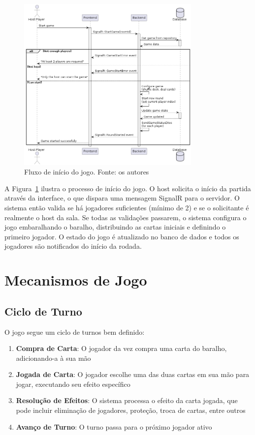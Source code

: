 \begin{figure}[h]
    \centering
    \includegraphics[width=0.8\textwidth]{diagrams/StartGame.png}
    \caption{Fluxo de início do jogo. Fonte: os autores}
    \label{fig:start-game-flow}
\end{figure}

A Figura~\ref{fig:start-game-flow} ilustra o processo de início do jogo. O host solicita o início da partida através da interface, o que dispara uma mensagem SignalR para o servidor. O sistema então valida se há jogadores suficientes (mínimo de 2) e se o solicitante é realmente o host da sala. Se todas as validações passarem, o sistema configura o jogo embaralhando o baralho, distribuindo as cartas iniciais e definindo o primeiro jogador. O estado do jogo é atualizado no banco de dados e todos os jogadores são notificados do início da rodada.

\section{Mecanismos de Jogo}

\subsection{Ciclo de Turno}
O jogo segue um ciclo de turnos bem definido:

\begin{enumerate}
    \item \textbf{Compra de Carta}: O jogador da vez compra uma carta do baralho, adicionando-a à sua mão
    \item \textbf{Jogada de Carta}: O jogador escolhe uma das duas cartas em sua mão para jogar, executando seu efeito específico
    \item \textbf{Resolução de Efeitos}: O sistema processa o efeito da carta jogada, que pode incluir eliminação de jogadores, proteção, troca de cartas, entre outros
    \item \textbf{Avanço de Turno}: O turno passa para o próximo jogador ativo
\end{enumerate}

